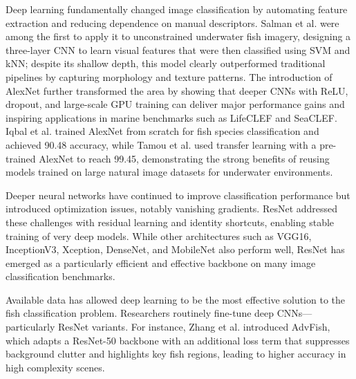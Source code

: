 Deep learning fundamentally changed image classification by automating feature extraction and reducing dependence on manual descriptors. Salman et al. were among the first to apply it to unconstrained underwater fish imagery, designing a three-layer CNN to learn visual features that were then classified using SVM and kNN; despite its shallow depth, this model clearly outperformed traditional pipelines by capturing morphology and texture patterns. The introduction of AlexNet further transformed
the area by showing that deeper CNNs with ReLU, dropout, and large-scale GPU training can deliver major performance gains and inspiring applications in marine benchmarks such as LifeCLEF and SeaCLEF. Iqbal et al. \cite{Iqbal2021fishClassificationCNN} trained AlexNet from scratch for fish species classification and achieved 90.48 accuracy, while Tamou et al. \cite{Tamou2018underwaterLiveFish} used transfer learning with a pre-trained AlexNet to reach 99.45, demonstrating the strong benefits of reusing models trained on large natural image datasets for underwater environments. 

Deeper neural networks have continued to improve classification performance but introduced optimization issues, notably vanishing gradients. ResNet addressed these challenges with residual learning and identity shortcuts, enabling stable training of very deep models. While other architectures such as VGG16, InceptionV3, Xception, DenseNet, and MobileNet also perform well, ResNet has emerged as a particularly efficient and effective backbone on many image classification benchmarks. 

Available data has allowed deep learning to be the most effective solution to the fish classification problem. Researchers routinely fine-tune deep CNNs—particularly ResNet variants. For instance, Zhang et al. \cite{Zhang2022largeScaleUnderwater} introduced AdvFish, which adapts a ResNet-50 backbone with an additional loss term that suppresses background clutter and highlights key fish regions, leading to higher accuracy in high complexity scenes. 
